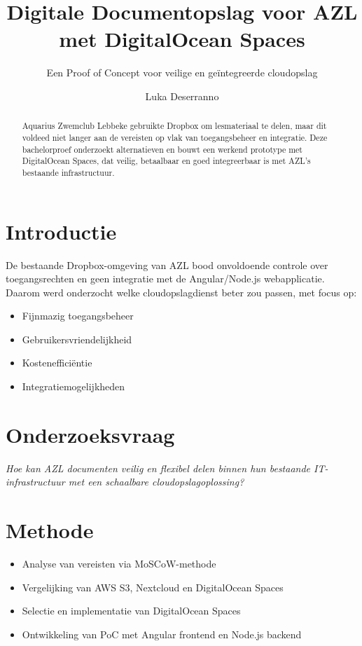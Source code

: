 \documentclass[a0,portrait]{hogent-poster}
\title{Digitale Documentopslag voor AZL met DigitalOcean Spaces}
\subtitle{Een Proof of Concept voor veilige en geïntegreerde cloudopslag}
\author{Luka Deserranno}
\begin{document}
\maketitle

\begin{abstract}
Aquarius Zwemclub Lebbeke gebruikte Dropbox om lesmateriaal te delen, maar dit voldeed niet langer aan de vereisten op vlak van toegangsbeheer en integratie. Deze bachelorproef onderzoekt alternatieven en bouwt een werkend prototype met DigitalOcean Spaces, dat veilig, betaalbaar en goed integreerbaar is met AZL’s bestaande infrastructuur.
\end{abstract}

\begin{multicols}{2}

\section{Introductie}
De bestaande Dropbox-omgeving van AZL bood onvoldoende controle over toegangsrechten en geen integratie met de Angular/Node.js webapplicatie. Daarom werd onderzocht welke cloudopslagdienst beter zou passen, met focus op:

\begin{itemize}
  \item Fijnmazig toegangsbeheer
  \item Gebruikersvriendelijkheid
  \item Kostenefficiëntie
  \item Integratiemogelijkheden
\end{itemize}

\section{Onderzoeksvraag}
\textit{Hoe kan AZL documenten veilig en flexibel delen binnen hun bestaande IT-infrastructuur met een schaalbare cloudopslagoplossing?}

\section{Methode}
\begin{itemize}
  \item Analyse van vereisten via MoSCoW-methode
  \item Vergelijking van AWS S3, Nextcloud en DigitalOcean Spaces
  \item Selectie en implementatie van DigitalOcean Spaces
  \item Ontwikkeling van PoC met Angular frontend en Node.js backend
\end{itemize}


\end{multicols}
\end{document}
